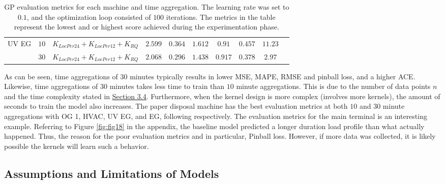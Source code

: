 \begin{table}[htbp]
{\begin{tabular}{lccccccccc}
    UV EG 
     & $10$ & $K_{LocPer24} + K_{LocPer12} + K_{RQ}$ & $2.599$ & $0.364$ & $1.612$ & $0.91$ & $0.457$ & $11.23$ \\
     & $30$ & $K_{LocPer24} + K_{LocPer12} + K_{RQ}$ & $2.068$ & $0.296$ & $1.438$ & $0.917$ & $0.378$ & $2.97$ \\
     
    \hline
    \end{tabular}}
    \caption{GP evaluation metrics for each machine and time aggregation. The learning rate was set to $0.1$, and the optimization loop consisted of $100$ iterations. The metrics in the table represent the lowest and or highest score achieved during the experimentation phase.}
    \label{tab:tab3}
\end{table}

As can be seen, time aggregations of $30$ minutes typically results in lower MSE, MAPE, RMSE and pinball loss, and a higher ACE. Likewise, time aggregations of $30$ minutes takes less time to train than $10$ minute aggregations. This is due to the number of data points $n$ and the time complexity stated in \hyperlink{subsection.3.4}{Section 3.4}. Furthermore, when the kernel design is more complex (involves more kernels), the amount of seconds to train the model also increases. The paper disposal machine has the best evaluation metrics at both $10$ and $30$ minute aggregations with OG 1, HVAC, UV EG, and EG, following respectively. The evaluation metrics for the main terminal is an interesting example. Referring to Figure \ref{fig:fig18} in the appendix, the baseline model predicted a longer duration load profile than what actually happened. Thus, the reason for the poor evaluation metrics and in particular, Pinball loss. However, if more data was collected, it is likely possible the kernels will learn such a behavior.

\subsection{Assumptions and Limitations of Models}

